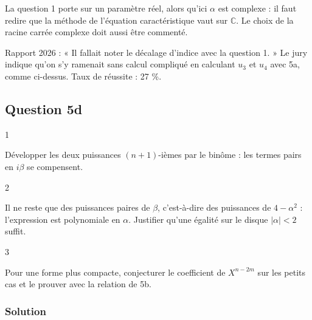 \documentclass[11pt,a4paper]{article}
\begin{document}
\begin{piege}

La question 1 porte sur un paramètre réel, alors qu'ici \(\alpha\) est complexe : il faut redire que la méthode de l'équation caractéristique vaut sur \(\mathbb C\). Le choix de la racine carrée complexe doit aussi être commenté.

\end{piege}

\begin{jury}

Rapport 2026 : « Il fallait noter le décalage d'indice avec la question 1. » Le jury indique qu'on s'y ramenait sans calcul compliqué en calculant \(u_3\) et \(u_4\) avec 5a, comme ci-dessus. Taux de réussite : 27 \%.

\end{jury}

\hypertarget{question-5d}{%
\subsection{Question 5d}\label{question-5d}}

\begin{indication}{1}

Développer les deux puissances \((n+1)\)-ièmes par le binôme : les termes pairs en \(i\beta\) se compensent.

\end{indication}

\begin{indication}{2}

Il ne reste que des puissances paires de \(\beta\), c'est-à-dire des puissances de \(4-\alpha^2\) : l'expression est polynomiale en \(\alpha\). Justifier qu'une égalité sur le disque \(|\alpha|<2\) suffit.

\end{indication}

\begin{indication}{3}

Pour une forme plus compacte, conjecturer le coefficient de \(X^{n-2m}\) sur les petits cas et le prouver avec la relation de 5b.

\end{indication}

\hypertarget{solution-10}{%
\subsubsection{Solution}\label{solution-10}}
\end{document}
